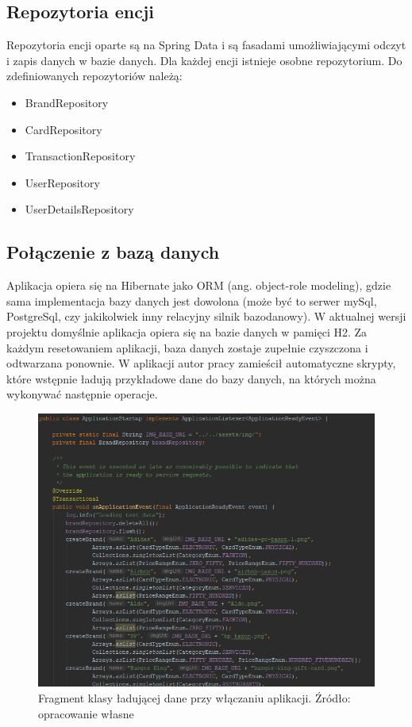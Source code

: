 \subsection{Repozytoria encji}
Repozytoria encji oparte są na Spring Data i są fasadami umożliwiającymi odczyt i zapis danych w bazie danych. Dla każdej encji istnieje osobne repozytorium. Do zdefiniowanych repozytoriów należą:
\begin{itemize}
    \item BrandRepository
    \item CardRepository
    \item TransactionRepository
    \item UserRepository
    \item UserDetailsRepository
\end{itemize}
\subsection{Połączenie z bazą danych}
Aplikacja opiera się na Hibernate jako ORM (ang. object-role modeling), gdzie sama implementacja bazy danych jest dowolona (może być to serwer mySql, PostgreSql, czy jakikolwiek inny relacyjny silnik bazodanowy). W aktualnej wersji projektu domyślnie aplikacja opiera się na bazie danych w pamięci H2. Za każdym resetowaniem aplikacji, baza danych zostaje zupełnie czyszczona i odtwarzana ponownie. W aplikacji autor pracy zamieścił automatyczne skrypty, które wstępnie ładują przykładowe dane do bazy danych, na których można wykonywać następnie operacje.

\begin{figure}[h!]
  \centering
    \includegraphics[width=1.0\textwidth]{images/script.PNG}
  \caption{Fragment klasy ładującej dane przy włączaniu aplikacji. Źródło: opracowanie własne }
\end{figure}
\FloatBarrier

